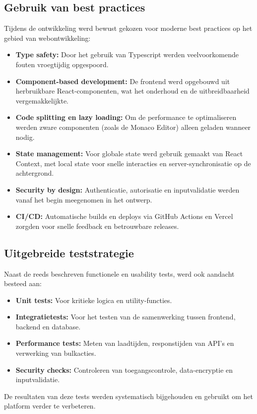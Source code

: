 \subsection{Gebruik van best practices}
Tijdens de ontwikkeling werd bewust gekozen voor moderne best practices op het gebied van webontwikkeling:
\begin{itemize}
    \item \textbf{Type safety:} Door het gebruik van Typescript werden veelvoorkomende fouten vroegtijdig opgespoord.
    \item \textbf{Component-based development:} De frontend werd opgebouwd uit herbruikbare React-componenten, wat het onderhoud en de uitbreidbaarheid vergemakkelijkte.
    \item \textbf{Code splitting en lazy loading:} Om de performance te optimaliseren werden zware componenten (zoals de Monaco Editor) alleen geladen wanneer nodig.
    \item \textbf{State management:} Voor globale state werd gebruik gemaakt van React Context, met local state voor snelle interacties en server-synchronisatie op de achtergrond.
    \item \textbf{Security by design:} Authenticatie, autorisatie en inputvalidatie werden vanaf het begin meegenomen in het ontwerp.
    \item \textbf{CI/CD:} Automatische builds en deploys via GitHub Actions en Vercel zorgden voor snelle feedback en betrouwbare releases.
\end{itemize}

\subsection{Uitgebreide teststrategie}
Naast de reeds beschreven functionele en usability tests, werd ook aandacht besteed aan:
\begin{itemize}
    \item \textbf{Unit tests:} Voor kritieke logica en utility-functies.
    \item \textbf{Integratietests:} Voor het testen van de samenwerking tussen frontend, backend en database.
    \item \textbf{Performance tests:} Meten van laadtijden, responstijden van API's en verwerking van bulkacties.
    \item \textbf{Security checks:} Controleren van toegangscontrole, data-encryptie en inputvalidatie.
\end{itemize}
De resultaten van deze tests werden systematisch bijgehouden en gebruikt om het platform verder te verbeteren.


